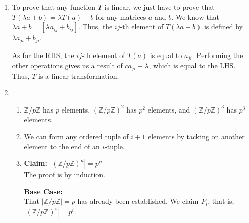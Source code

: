 \documentclass[12pt]{article}
\begin{document}
\begin{enumerate}
      \item To prove that any function $T$ is linear, we just have to prove that
            $T(\lambda a+b)=\lambda T(a)+b$ for any matrices $a$ and $b$.
            We know that $\lambda a+b=[\lambda a_{ij}+b_{ij}]$.
            Thus, the $ij$-th element of $T(\lambda a+b)$ is defined by $\lambda a_{ji}+b_{ji}$.

            As for the RHS, the $ij$-th element of $T(a)$ is equal to $a_{ji}$.
            Performing the other operations gives us a result of $ca_{ji}+\lambda$,
            which is equal to the LHS.
            Thus, $T$ is a linear transformation.
      \item \begin{enumerate}
                  \item $\mathbb{Z}/p\mathbb{Z}$ has $p$ elements.
                        $(\mathbb{Z}/p\mathbb{Z})^2$ has $p^2$ elements, and $(\mathbb{Z}/p\mathbb{Z})^3$ has $p^3$ elements.
                  \item We can form any ordered tuple of $i+1$ elements by tacking on another element to the end of an $i$-tuple.
                  \item \textbf{Claim:} $|(\mathbb{Z}/p\mathbb{Z})^n|=p^n$ \\
                        The proof is by induction.

                        \textbf{Base Case:} \\
                        That $|\mathbb{Z}/p\mathbb{Z}|=p$ has already been established.
                        We claim $P_i$, that is, $|(\mathbb{Z}/p\mathbb{Z})^i|=p^i$.


\end{enumerate}
\end{enumerate}
\end{document}
